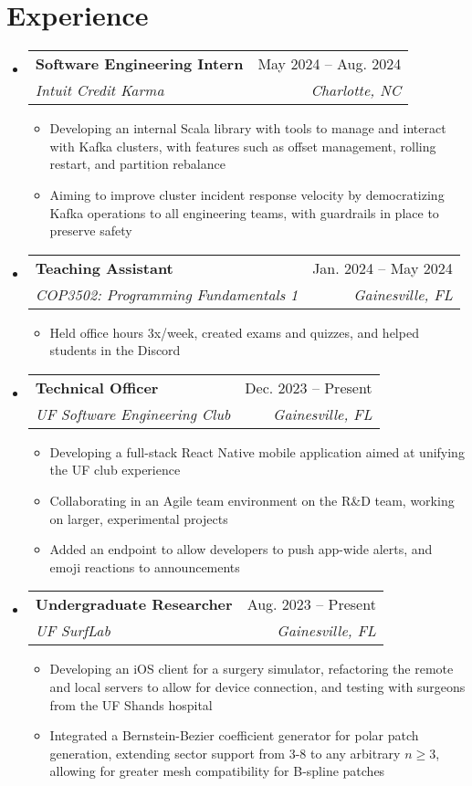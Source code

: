 \documentclass[letterpaper,12pt]{article}
\makeatletter
\newcommand{\resumeItem}[1]{
  \item\small{
    {#1 \vspace{-2pt}}
  }
}
\newcommand{\resumeSubheading}[4]{
  \vspace{-2pt}\item
    \begin{tabular*}{0.97\textwidth}[t]{l@{\extracolsep{\fill}}r}
      \textbf{#1} & #2 \\
      \textit{\small#3} & \textit{\small #4} \\
    \end{tabular*}\vspace{-7pt}
}
\newcommand{\resumeSubHeadingListStart}{\begin{itemize}[leftmargin=0.15in, label={}]}
\newcommand{\resumeSubHeadingListEnd}{\end{itemize}}
\newcommand{\resumeItemListStart}{\begin{itemize}}
\newcommand{\resumeItemListEnd}{\end{itemize}\vspace{-5pt}}
\makeatother
\begin{document}
\section{Experience}
  \resumeSubHeadingListStart
    \resumeSubheading
      {Software Engineering Intern}{May 2024 -- Aug. 2024}
      {Intuit Credit Karma}{Charlotte, NC}
      \resumeItemListStart
        \resumeItem{Developing an internal Scala library with tools to manage and interact with Kafka clusters, with features such as offset management, rolling restart, and partition rebalance}
        \resumeItem{Aiming to improve cluster incident response velocity by democratizing Kafka operations to all engineering teams, with guardrails in place to preserve safety}
      \resumeItemListEnd
      \resumeSubheading
      {Teaching Assistant}{Jan. 2024 -- May 2024}
      {COP3502: Programming Fundamentals 1}{Gainesville, FL}
      \resumeItemListStart
        \resumeItem{Held office hours 3x/week, created exams and quizzes, and helped students in the Discord}
      \resumeItemListEnd
      \resumeSubheading
      {Technical Officer}{Dec. 2023 -- Present}
      {UF Software Engineering Club}{Gainesville, FL}
      \resumeItemListStart
        \resumeItem{Developing a full-stack React Native mobile application aimed at unifying the UF club experience}
        \resumeItem{Collaborating in an Agile team environment on the R\&D team, working on larger, experimental projects}
        \resumeItem{Added an endpoint to allow developers to push app-wide alerts, and emoji reactions to announcements}
      \resumeItemListEnd
    \resumeSubheading
      {Undergraduate Researcher}{Aug. 2023 -- Present}
      {UF SurfLab}{Gainesville, FL}
      \resumeItemListStart
        \resumeItem{Developing an iOS client for a surgery simulator, refactoring the remote and local servers to allow for device connection, and testing with surgeons from the UF Shands hospital}
        \resumeItem{Integrated a Bernstein-Bezier coefficient generator for polar patch generation, extending sector support from 3-8 to any arbitrary $n \geq 3$, allowing for greater mesh compatibility for B-spline patches}
      \resumeItemListEnd
  \resumeSubHeadingListEnd
\end{document}
